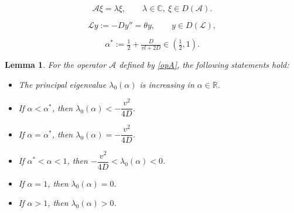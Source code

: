 \documentclass[10pt,a4paper]{amsart}
\newtheorem{lemma}{Lemma}
\begin{document}
\begin{equation}\label{eq:eigen_problem}
\mathcal{A}\xi=\lambda\xi,\qquad \lambda\in\mathbb{C},\ \xi\in D(\mathcal{A}).
\end{equation}

\begin{equation}\label{eq:operator_L}
\mathcal{L}y:=- D y'' = \theta y, \qquad y\in D(\mathcal{L}),
\end{equation}

\begin{equation}\label{eq:alpha*}
\alpha^*:=\tfrac{1}{2}+\tfrac{D}{vl+2D}\in\left(\tfrac{1}{2},1\right).   
\end{equation}

\begin{lemma}\label{lem:dependelne_on_alpha}
For the operator $\mathcal{A}$ defined by \eqref{opA}, the following statements hold:
\begin{itemize}
    \item[$(i)$] The principal eigenvalue $\lambda_0(\alpha)$ is increasing in $\alpha\in\mathbb R$.

    \item[$(ii)$] If $\alpha < \alpha^*$, then $\lambda_0(\alpha)<-\dfrac{v^2}{4D}$.

    \item[$(iii)$] If $\alpha = \alpha^*$, then $\lambda_0(\alpha)=-\dfrac{v^2}{4D}$.

    \item[$(iv)$] If $\alpha^*<\alpha<1$, then $-\dfrac{v^2}{4D}<\lambda_0(\alpha)<0$.
    
    \item[$(v)$] If $\alpha = 1$, then $\lambda_0(\alpha)=0$.
    
    \item[$(vi)$] If $\alpha > 1$, then $\lambda_0(\alpha)>0$.
\end{itemize}
\end{lemma}
\end{document}
